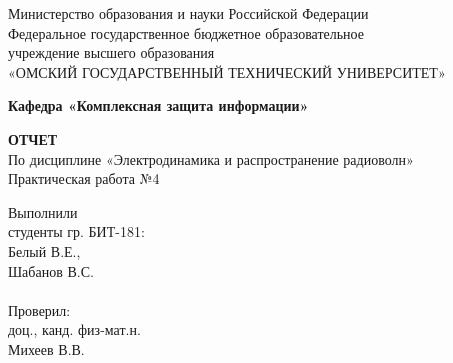 \documentclass[fontsize=14pt,a4paper]{scrartcl}
\begin{document}
  \begin{titlepage}                                                         
    \newpage                                                                        
    \begin{center}   
      Министерство образования и науки Российской Федерации  \\ 
      \vspace{1em}                                                    
      {\mdseries
        Федеральное государственное бюджетное образовательное \\
        учреждение высшего образования \\
        «ОМСКИЙ ГОСУДАРСТВЕННЫЙ ТЕХНИЧЕСКИЙ УНИВЕРСИТЕТ»
      }                               
      \vspace{1em}      

      {\bfseries Кафедра «Комплексная защита информации»}  

      \vspace{\fill}                                                         
                                   
      {\bfseries ОТЧЕТ } \\                                 
      По дисциплине «Электродинамика и распространение радиоволн» \\ 
      \vspace{1em} 
      Практическая работа №4 \\                                                           
    \end{center}                                                          
                                                                                        
    \vspace{\fill}                                                         
                                                                                        
    \hfill\parbox{5cm}{
      Выполнили\\
      студенты гр. БИТ-181:\\
      Белый В.Е., \\
      Шабанов В.С.\\
      \\
      Проверил:\\
      доц., канд. физ-мат.н. \\
      Михеев В.В.\\
    }                                                                                                                              
                                                                                                                                                                              

\end{titlepage}
\end{document}
